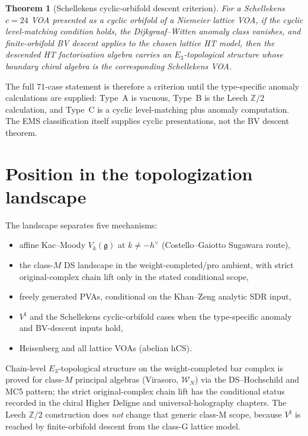 \documentclass[11pt]{amsart}
\newtheorem{theorem}{Theorem}[section]
\theoremstyle{definition}
\theoremstyle{remark}
\providecommand{\Z}{\mathbb{Z}}
\providecommand{\fg}{\mathfrak{g}}
\begin{document}
\begin{theorem}[Schellekens cyclic-orbifold descent criterion]
\label{thm:schellekens-71-standalone}
For a Schellekens $c=24$ VOA presented as a cyclic orbifold of a
Niemeier lattice VOA, if the cyclic level-matching condition holds,
the Dijkgraaf--Witten anomaly class vanishes, and finite-orbifold BV
descent applies to the chosen lattice HT model, then the descended HT
factorisation algebra carries an $E_3$-topological structure whose
boundary chiral algebra is the corresponding Schellekens VOA.
\end{theorem}

The full 71-case statement is therefore a criterion until the
type-specific anomaly calculations are supplied: Type~A is vacuous,
Type~B is the Leech $\Z/2$ calculation, and Type~C is a cyclic
level-matching plus anomaly computation. The EMS classification itself
supplies cyclic presentations, not the BV descent theorem.

\section{Position in the topologization landscape}

The landscape separates five mechanisms:
\begin{itemize}[nosep]
\item affine Kac--Moody $V_k(\fg)$ at $k \neq -h^\vee$
(Costello--Gaiotto Sugawara route),
\item the class-$M$ DS landscape in the weight-completed/pro ambient,
with strict original-complex chain lift only in the stated conditional
scope,
\item freely generated PVAs, conditional on the Khan--Zeng analytic
SDR input,
\item $V^\natural$ and the Schellekens cyclic-orbifold cases when the
type-specific anomaly and BV-descent inputs hold,
\item Heisenberg and all lattice VOAs (abelian hCS).
\end{itemize}
Chain-level $E_3$-topological structure on the weight-completed
bar complex is proved for class-$M$ principal algebras (Virasoro,
$\mathcal{W}_N$) via the DS--Hochschild and MC5 pattern; the strict
original-complex chain lift has the conditional status recorded in
the chiral Higher Deligne and universal-holography chapters. The
Leech $\Z/2$ construction does \emph{not} change that generic class-M
scope, because $V^\natural$ is reached by finite-orbifold descent from
the class-G lattice model.
\end{document}
